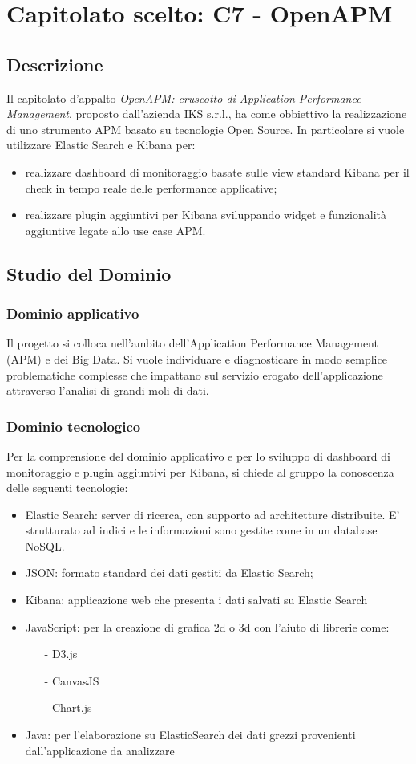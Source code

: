 \newpage
\section{Capitolato scelto: C7 - OpenAPM}
	\subsection{Descrizione}
	Il capitolato d'appalto \emph{OpenAPM: cruscotto di Application Performance Management},  proposto dall'azienda IKS s.r.l., ha come obbiettivo la realizzazione di uno strumento APM basato su tecnologie Open Source. In particolare si vuole utilizzare Elastic Search e Kibana per:
	\begin{itemize}
		\item realizzare dashboard di monitoraggio  basate sulle view standard Kibana per il check in tempo reale delle performance applicative;
		\item realizzare plugin aggiuntivi per Kibana sviluppando widget e funzionalità aggiuntive legate allo use case APM. 
	\end{itemize}
	
	\subsection{Studio del Dominio}
		\subsubsection{Dominio applicativo}
		Il progetto si colloca nell'ambito dell'Application Performance Management (APM) e dei Big Data. Si vuole individuare e diagnosticare in modo semplice problematiche complesse che impattano sul servizio erogato dell'applicazione attraverso l'analisi di grandi moli di dati.
		\subsubsection{Dominio tecnologico}
		Per la comprensione del dominio applicativo e per lo sviluppo di dashboard di monitoraggio e plugin aggiuntivi per Kibana, si chiede al gruppo la conoscenza delle seguenti tecnologie:
		\begin{itemize}
			\item Elastic Search: server di ricerca, con supporto ad architetture distribuite. E' strutturato ad indici e le informazioni sono gestite come in un database NoSQL.
			\item JSON: formato standard dei dati gestiti da Elastic Search;
			\item Kibana: applicazione web che presenta i dati salvati su Elastic Search
			\item JavaScript: per la creazione di grafica 2d o 3d con l'aiuto di librerie come:
			\begin{itemize}
				\item[-] D3.js
				\item[-] CanvasJS
				\item[-] Chart.js
			\end{itemize}
			\item Java: per l'elaborazione su ElasticSearch dei dati grezzi provenienti dall'applicazione da analizzare
		\end{itemize}

